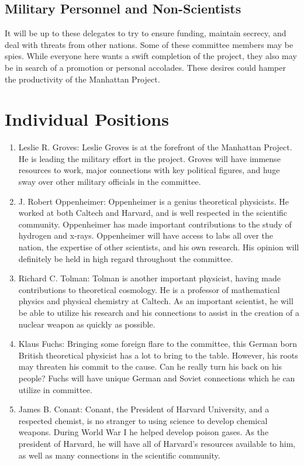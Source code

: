 \documentclass[11 pt, twoside]{article}
\begin{document}
\subsection{Military Personnel and Non-Scientists}
It will be up to these delegates to try to ensure funding, maintain secrecy, and deal with threats from other nations. Some of these committee members may be spies. While everyone here wants  a swift completion of the project, they also may be in search of a promotion or personal accolades. These desires could hamper the productivity of the Manhattan Project. 

\section{Individual Positions}
\begin{enumerate}
\item Leslie R. Groves: Leslie Groves is at the forefront of the Manhattan Project. He is leading the military effort in the project. Groves will have immense resources to work, major connections with key political figures, and huge sway over other military officials in the committee. 
\item J. Robert Oppenheimer: Oppenheimer is a genius theoretical physicists. He worked at both Caltech and Harvard, and is well respected in the scientific community. Oppenheimer has made important contributions to the study of hydrogen and x-rays. Oppenheimer will have access to labs all over the nation, the expertise of other scientists, and his own research. His opinion will definitely be held in high regard throughout the committee.
\item Richard C. Tolman: Tolman is another important physicist, having made contributions to theoretical cosmology. He is a professor of mathematical physics and physical chemistry at Caltech. As an important scientist, he will be able to utilize his research and his connections to assist in the creation of a nuclear weapon as quickly as possible. 
\item Klaus Fuchs: Bringing some foreign flare to the committee, this German born British theoretical physicist has a lot to bring to the table. However, his roots may threaten his commit to the cause. Can he really turn his back on his people? Fuchs will have unique German and Soviet connections which he can utilize in committee. 
\item James B. Conant: Conant, the President of Harvard University, and a respected chemist, is no stranger to using science to develop chemical weapons. During World War I he helped develop poison gases. As the president of Harvard, he will have all of Harvard’s resources available to him, as well as many connections in the scientific community.

\end{enumerate}
\end{document}
